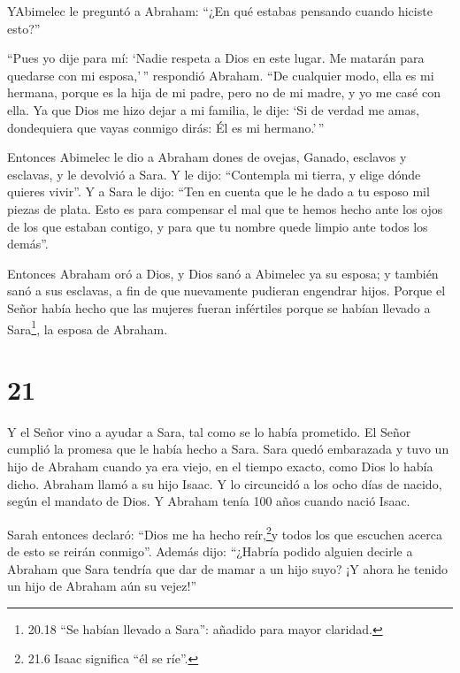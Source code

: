  YAbimelec le preguntó a Abraham: ``¿En qué estabas
pensando cuando hiciste esto?''

 ``Pues yo dije para mí: `Nadie respeta a Dios en este
lugar. Me matarán para quedarse con mi esposa,'\,'' respondió Abraham.
 ``De cualquier modo, ella es mi hermana, porque es la hija
de mi padre, pero no de mi madre, y yo me casé con ella. 
Ya que Dios me hizo dejar a mi familia, le dije: `Si de verdad me amas,
dondequiera que vayas conmigo dirás: Él es mi hermano.'\,''

 Entonces Abimelec le dio a Abraham dones de ovejas,
Ganado, esclavos y esclavas, y le devolvió a Sara.  Y le
dijo: ``Contempla mi tierra, y elige dónde quieres vivir''.
 Y a Sara le dijo: ``Ten en cuenta que le he dado a tu
esposo mil piezas de plata. Esto es para compensar el mal que te hemos
hecho ante los ojos de los que estaban contigo, y para que tu nombre
quede limpio ante todos los demás''.

 Entonces Abraham oró a Dios, y Dios sanó a Abimelec ya su
esposa; y también sanó a sus esclavas, a fin de que nuevamente pudieran
engendrar hijos.  Porque el Señor había hecho que las
mujeres fueran infértiles porque se habían llevado a Sara\footnote{20.18
  ``Se habían llevado a Sara'': añadido para mayor claridad.}, la esposa
de Abraham.

\hypertarget{section-20}{%
\section{21}\label{section-20}}

 Y el Señor vino a ayudar a Sara, tal como se lo había
prometido. El Señor cumplió la promesa que le había hecho a Sara.
 Sara quedó embarazada y tuvo un hijo de Abraham cuando ya
era viejo, en el tiempo exacto, como Dios lo había dicho. 
Abraham llamó a su hijo Isaac.  Y lo circuncidó a los ocho
días de nacido, según el mandato de Dios.  Y Abraham tenía
100 años cuando nació Isaac.

 Sarah entonces declaró: ``Dios me ha hecho
reír,\footnote{21.6 Isaac significa ``él se ríe''.}y todos los que
escuchen acerca de esto se reirán conmigo''.  Además dijo:
``¿Habría podido alguien decirle a Abraham que Sara tendría que dar de
mamar a un hijo suyo? ¡Y ahora he tenido un hijo de Abraham aún su
vejez!''

